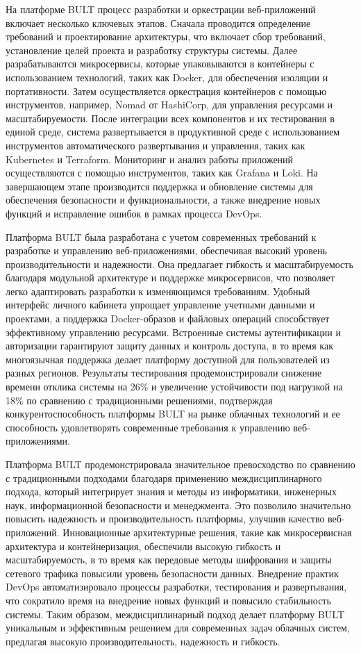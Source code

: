 \begin{multicols}{2}
На платформе BULT процесс разработки и оркестрации веб-приложений
включает несколько ключевых этапов. Сначала проводится определение
требований и проектирование архитектуры, что включает сбор требований,
установление целей проекта и разработку структуры системы. Далее
разрабатываются микросервисы, которые упаковываются в контейнеры с
использованием технологий, таких как Docker, для обеспечения изоляции и
портативности. Затем осуществляется оркестрация контейнеров с помощью
инструментов, например, Nomad от HashiCorp, для управления ресурсами и
масштабируемости. После интеграции всех компонентов и их тестирования в
единой среде, система развертывается в продуктивной среде с
использованием инструментов автоматического развертывания и управления,
таких как Kubernetes и Terraform. Мониторинг и анализ работы приложений
осуществляются с помощью инструментов, таких как Grafana и Loki. На
завершающем этапе производится поддержка и обновление системы для
обеспечения безопасности и функциональности, а также внедрение новых
функций и исправление ошибок в рамках процесса DevOps.

Платформа BULT была разработана с учетом современных требований к
разработке и управлению веб-приложениями, обеспечивая высокий уровень
производительности и надежности. Она предлагает гибкость и
масштабируемость благодаря модульной архитектуре и поддержке
микросервисов, что позволяет легко адаптировать разработки к
изменяющимся требованиям. Удобный интерфейс личного кабинета упрощает
управление учетными данными и проектами, а поддержка Docker-образов и
файловых операций способствует эффективному управлению ресурсами.
Встроенные системы аутентификации и авторизации гарантируют защиту
данных и контроль доступа, в то время как многоязычная поддержка делает
платформу доступной для пользователей из разных регионов. Результаты
тестирования продемонстрировали снижение времени отклика системы на 26\%
и увеличение устойчивости под нагрузкой на 18\% по сравнению с
традиционными решениями, подтверждая конкурентоспособность платформы
BULT на рынке облачных технологий и ее способность удовлетворять
современные требования к управлению веб-приложениями.

Платформа BULT продемонстрировала значительное превосходство по
сравнению с традиционными подходами благодаря применению
междисциплинарного подхода, который интегрирует знания и методы из
информатики, инженерных наук, информационной безопасности и менеджмента.
Это позволило значительно повысить надежность и производительность
платформы, улучшив качество веб-приложений. Инновационные архитектурные
решения, такие как микросервисная архитектура и контейнеризация,
обеспечили высокую гибкость и масштабируемость, в то время как передовые
методы шифрования и защиты сетевого трафика повысили уровень
безопасности данных. Внедрение практик DevOps автоматизировало процессы
разработки, тестирования и развертывания, что сократило время на
внедрение новых функций и повысило стабильность системы. Таким образом,
междисциплинарный подход делает платформу BULT уникальным и эффективным
решением для современных задач облачных систем, предлагая высокую
производительность, надежность и гибкость.


\end{multicols}
